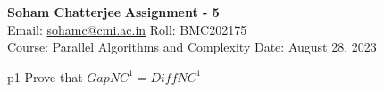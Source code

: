 \documentclass[a4paper, 11pt]{article}
\begin{document}
	
	
	\textsf{\noindent \large\textbf{Soham Chatterjee} \hfill \textbf{Assignment - 5}\\
		Email: \href{sohamc@cmi.ac.in}{sohamc@cmi.ac.in} \hfill Roll: BMC202175\\
		\normalsize Course: Parallel Algorithms and Complexity \hfill Date: August 28, 2023}
	
	
	\begin{problem}{%
		}{p1%
		}
Prove that $GapNC^1=DiffNC^1$
		
	\end{problem}
	
\end{document}
